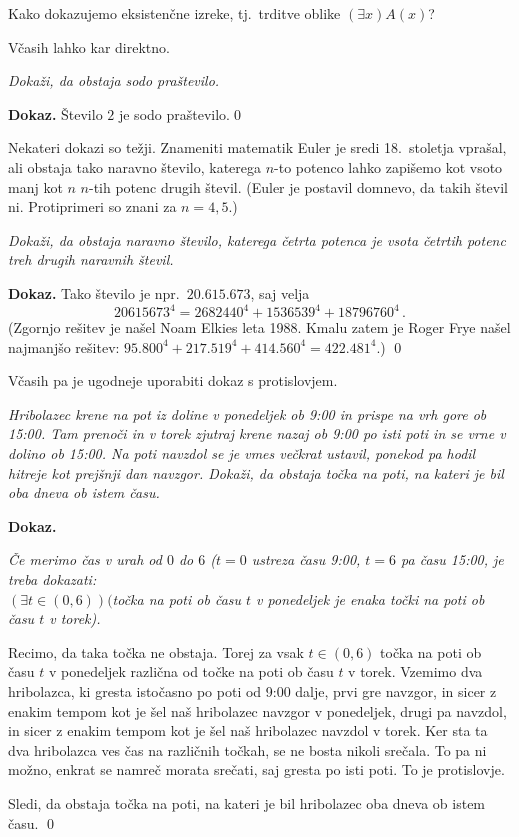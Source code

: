 \documentclass[11pt,paper=b5,DIV=13,headinclude,footinclude]{scrbook}
\newcounter{example}
\begin{document}
Kako dokazujemo eksistenčne izreke, tj.~trditve oblike $(\exists x)A(x)$?

Včasih lahko kar direktno.

\begin{example*}
\emph{ Dokaži, da obstaja sodo praštevilo.}

\medskip \noindent\textbf{ Dokaz.}
Število $2$ je sodo praštevilo.\qed

\bigskip
Nekateri dokazi so težji. Znameniti matematik Euler je sredi 18.~stoletja vprašal, ali obstaja tako naravno število, katerega $n$-to potenco lahko zapišemo kot vsoto manj kot $n$ $n$-tih potenc drugih števil. (Euler je postavil domnevo, da takih števil ni. Protiprimeri so znani za $n = 4,5$.)
\end{example*}
\smallskip
\begin{example*}
\emph{ Dokaži, da obstaja naravno število, katerega četrta potenca je vsota četrtih potenc treh drugih naravnih števil.}

\medskip \noindent\textbf{ Dokaz.}
Tako število je npr.~$20.615.673$, saj velja
$$20615673^4 = 2682440^4+1536539^4+18796760^4\,.$$
(Zgornjo rešitev je našel Noam Elkies leta 1988. Kmalu zatem je Roger Frye našel najmanjšo rešitev: $95.800^4 + 217.519^4 + 414.560^4 = 422.481^4$.)
\qed


Včasih pa je ugodneje uporabiti dokaz s protislovjem.
\end{example*}
\medskip
\begin{example*}
\emph{ Hribolazec krene na pot iz doline v ponedeljek ob 9:00 in prispe na vrh gore ob 15:00. Tam prenoči in v torek zjutraj krene nazaj ob 9:00 po isti poti in se vrne v dolino ob 15:00. Na poti navzdol se je vmes večkrat ustavil, ponekod pa hodil hitreje kot prejšnji dan navzgor.
Dokaži, da obstaja točka na poti, na kateri je bil oba dneva ob istem času.}

\medskip \noindent\textbf{ Dokaz.}

\emph{ Če merimo čas v urah od $0$ do $6$ ($t = 0$ ustreza času 9:00, $t = 6$ pa času 15:00, je treba dokazati:\\
 $(\exists t\in (0,6))($točka na poti ob času $t$ v ponedeljek je enaka točki na poti ob času $t$ v torek).}

Recimo, da taka točka ne obstaja. Torej za vsak $t\in (0,6)$ točka na poti ob času $t$ v ponedeljek različna od točke na poti ob času $t$ v torek.
Vzemimo dva hribolazca, ki gresta istočasno po poti od 9:00 dalje, prvi gre navzgor,
in sicer z enakim tempom kot je šel naš hribolazec navzgor v ponedeljek, drugi pa navzdol,
in sicer z enakim tempom kot je šel naš hribolazec navzdol v torek.
Ker sta ta dva hribolazca ves čas na različnih točkah, se ne bosta nikoli srečala.
To pa ni možno, enkrat se namreč morata srečati, saj gresta po isti poti. To je protislovje.

Sledi, da obstaja točka na poti, na kateri je bil hribolazec oba dneva ob istem času.
\qed
\end{example*}
\end{document}
